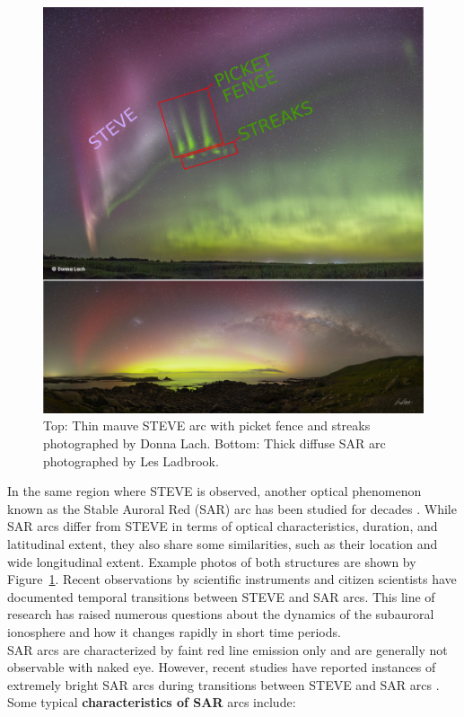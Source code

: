 \documentclass{article}
\renewcommand{\cite}[1]{\parencite{#1}}
\begin{document}
\begin{figure}[h!]
  \includegraphics[width=\linewidth]{Fig6_stevesararc.png}
  \caption{Top: Thin mauve STEVE arc with picket fence and streaks photographed by Donna Lach. Bottom: Thick diffuse SAR arc photographed by Les Ladbrook.}
  \label{stevesararc}
\end{figure}
In the same region where STEVE is observed, another optical phenomenon known as the Stable Auroral Red (SAR) arc has been studied for decades \cite{Kozyra1997, Mendillo_2016a, Martinis2022}. While SAR arcs differ from STEVE in terms of optical characteristics, duration, and latitudinal extent, they also share some similarities, such as their location and wide longitudinal extent. Example photos of both structures are shown by Figure~\ref{stevesararc}. Recent observations by scientific instruments and citizen scientists have documented temporal transitions between STEVE and SAR arcs. This line of research has raised numerous questions about the dynamics of the subauroral ionosphere and how it changes rapidly in short time periods.\\

SAR arcs are characterized by faint red line emission only and are generally not observable with naked eye. However, recent studies have reported instances of extremely bright SAR arcs during transitions between STEVE and SAR arcs \cite{Martinis2022}. Some typical {\bf characteristics of SAR} arcs include:
\end{document}
